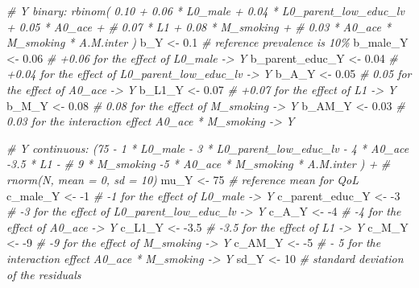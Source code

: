 \documentclass[
]{book}
\newenvironment{Shaded}{\begin{snugshade}}{\end{snugshade}}
\newcommand{\CommentTok}[1]{\textcolor[rgb]{0.56,0.35,0.01}{\textit{#1}}}
\newcommand{\DecValTok}[1]{\textcolor[rgb]{0.00,0.00,0.81}{#1}}
\newcommand{\FloatTok}[1]{\textcolor[rgb]{0.00,0.00,0.81}{#1}}
\newcommand{\NormalTok}[1]{#1}
\newcommand{\OtherTok}[1]{\textcolor[rgb]{0.56,0.35,0.01}{#1}}
\newcommand{\SpecialCharTok}[1]{\textcolor[rgb]{0.00,0.00,0.00}{#1}}
\begin{document}
\begin{Shaded}
\begin{Highlighting}[]
\CommentTok{\# Y binary: rbinom( 0.10 + 0.06 * L0\_male + 0.04 * L0\_parent\_low\_educ\_lv + 0.05 * A0\_ace +}
\CommentTok{\#                   0.07 * L1 + 0.08 * M\_smoking +}
\CommentTok{\#                   0.03 * A0\_ace * M\_smoking * A.M.inter ) }
\NormalTok{b\_Y }\OtherTok{\textless{}{-}} \FloatTok{0.1} \CommentTok{\# reference prevalence is 10\%}
\NormalTok{b\_male\_Y }\OtherTok{\textless{}{-}} \FloatTok{0.06} \CommentTok{\# +0.06 for the effect of L0\_male {-}\textgreater{} Y}
\NormalTok{b\_parent\_educ\_Y }\OtherTok{\textless{}{-}} \FloatTok{0.04} \CommentTok{\# +0.04 for the effect of L0\_parent\_low\_educ\_lv {-}\textgreater{} Y}
\NormalTok{b\_A\_Y }\OtherTok{\textless{}{-}} \FloatTok{0.05} \CommentTok{\# 0.05 for the effect of A0\_ace {-}\textgreater{} Y}
\NormalTok{b\_L1\_Y }\OtherTok{\textless{}{-}} \FloatTok{0.07} \CommentTok{\# +0.07 for the effect of L1 {-}\textgreater{} Y}
\NormalTok{b\_M\_Y }\OtherTok{\textless{}{-}} \FloatTok{0.08} \CommentTok{\# 0.08 for the effect of M\_smoking {-}\textgreater{} Y}
\NormalTok{b\_AM\_Y }\OtherTok{\textless{}{-}} \FloatTok{0.03} \CommentTok{\# 0.03 for the interaction effect A0\_ace * M\_smoking {-}\textgreater{} Y}

\CommentTok{\# Y continuous: (75 {-} 1 * L0\_male {-} 3 * L0\_parent\_low\_educ\_lv {-} 4 * A0\_ace {-}3.5 * L1 {-} }
\CommentTok{\#                9 * M\_smoking {-}5 * A0\_ace * M\_smoking * A.M.inter ) + }
\CommentTok{\#                rnorm(N, mean = 0, sd = 10)}
\NormalTok{mu\_Y }\OtherTok{\textless{}{-}} \DecValTok{75} \CommentTok{\# reference mean for QoL}
\NormalTok{c\_male\_Y }\OtherTok{\textless{}{-}} \SpecialCharTok{{-}}\DecValTok{1} \CommentTok{\# {-}1 for the effect of L0\_male {-}\textgreater{} Y}
\NormalTok{c\_parent\_educ\_Y }\OtherTok{\textless{}{-}} \SpecialCharTok{{-}}\DecValTok{3} \CommentTok{\# {-}3 for the effect of L0\_parent\_low\_educ\_lv {-}\textgreater{} Y}
\NormalTok{c\_A\_Y }\OtherTok{\textless{}{-}} \SpecialCharTok{{-}}\DecValTok{4} \CommentTok{\# {-}4 for the effect of A0\_ace {-}\textgreater{} Y}
\NormalTok{c\_L1\_Y }\OtherTok{\textless{}{-}} \SpecialCharTok{{-}}\FloatTok{3.5} \CommentTok{\# {-}3.5 for the effect of L1 {-}\textgreater{} Y}
\NormalTok{c\_M\_Y }\OtherTok{\textless{}{-}} \SpecialCharTok{{-}}\DecValTok{9} \CommentTok{\# {-}9 for the effect of M\_smoking {-}\textgreater{} Y}
\NormalTok{c\_AM\_Y }\OtherTok{\textless{}{-}} \SpecialCharTok{{-}}\DecValTok{5}  \CommentTok{\# {-} 5 for the interaction effect A0\_ace * M\_smoking  {-}\textgreater{} Y}
\NormalTok{sd\_Y }\OtherTok{\textless{}{-}} \DecValTok{10} \CommentTok{\# standard deviation of the residuals}


\end{Highlighting}
\end{Shaded}
\end{document}
